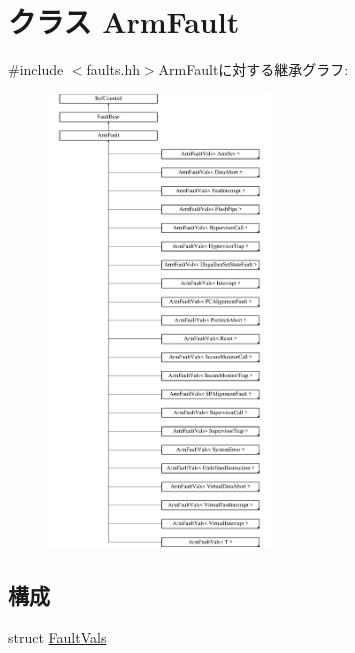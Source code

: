 \hypertarget{classArmISA_1_1ArmFault}{
\section{クラス ArmFault}
\label{classArmISA_1_1ArmFault}
}


{\ttfamily \#include $<$faults.hh$>$}ArmFaultに対する継承グラフ:\begin{figure}[H]
\begin{center}
\leavevmode
\includegraphics[height=12cm]{classArmISA_1_1ArmFault}
\end{center}
\end{figure}
\subsection*{構成}
\begin{DoxyCompactItemize}
\item 
struct \hyperlink{structArmISA_1_1ArmFault_1_1FaultVals}{FaultVals}
\end{DoxyCompactItemize}

